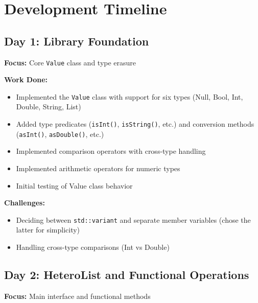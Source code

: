 \documentclass[11pt,a4paper]{article}
\begin{document}
\section{Development Timeline}

\subsection{Day 1: Library Foundation}

\textbf{Focus:} Core \texttt{Value} class and type erasure

\textbf{Work Done:}
\begin{itemize}
    \item Implemented the \texttt{Value} class with support for six types (Null, Bool, Int, Double, String, List)
    \item Added type predicates (\texttt{isInt()}, \texttt{isString()}, etc.) and conversion methods (\texttt{asInt()}, \texttt{asDouble()}, etc.)
    \item Implemented comparison operators with cross-type handling
    \item Implemented arithmetic operators for numeric types
    \item Initial testing of Value class behavior
\end{itemize}

\textbf{Challenges:}
\begin{itemize}
    \item Deciding between \texttt{std::variant} and separate member variables (chose the latter for simplicity)
    \item Handling cross-type comparisons (Int vs Double)
\end{itemize}

\subsection{Day 2: HeteroList and Functional Operations}

\textbf{Focus:} Main interface and functional methods
\end{document}
